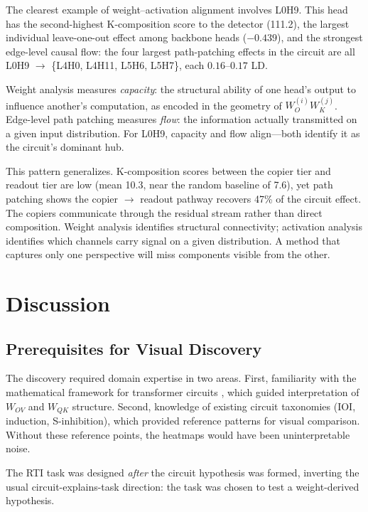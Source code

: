 \documentclass{article}
\begin{document}
The clearest example of weight--activation alignment involves L0H9.
This head has the second-highest K-composition score to the detector
(111.2), the largest individual leave-one-out effect among backbone
heads ($-0.439$), and the strongest edge-level causal flow: the four
largest path-patching effects in the circuit are all L0H9 $\to$
\{L4H0, L4H11, L5H6, L5H7\}, each $0.16$--$0.17$ LD.

Weight analysis measures \emph{capacity}: the structural ability of one
head's output to influence another's computation, as encoded in the
geometry of $W_O^{(i)} W_K^{(j)}$. Edge-level path patching
measures \emph{flow}: the information actually transmitted on a given
input distribution. For L0H9, capacity and flow align---both identify
it as the circuit's dominant hub.

This pattern generalizes. K-composition scores between the copier tier
and readout tier are low (mean 10.3, near the random baseline of 7.6),
yet path patching shows the copier $\to$ readout pathway recovers
47\% of the circuit effect. The copiers communicate through
the residual stream rather than direct composition. Weight analysis
identifies structural connectivity; activation analysis identifies
which channels carry signal on a given distribution. A method that
captures only one perspective will miss components visible from the
other.


\section{Discussion}
\label{sec:discussion}

\subsection{Prerequisites for Visual Discovery}

The discovery required domain expertise in two areas. First, familiarity
with the mathematical framework for transformer circuits
\citep{elhage2021mathematical}, which guided interpretation of $W_{OV}$
and $W_{QK}$ structure. Second, knowledge of existing circuit taxonomies
(IOI, induction, S-inhibition), which provided reference patterns for
visual comparison. Without these reference points, the heatmaps would
have been uninterpretable noise.

The RTI task was designed \emph{after} the circuit hypothesis was formed,
inverting the usual circuit-explains-task direction: the task was chosen
to test a weight-derived hypothesis.
\end{document}

